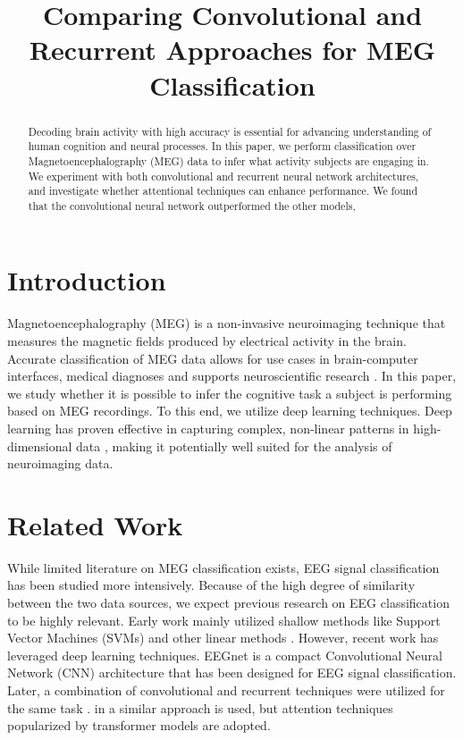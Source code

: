 \documentclass[conference]{IEEEtran}
\begin{document}
\title{Comparing Convolutional and Recurrent Approaches for MEG Classification}

\author{
}

\maketitle

\begin{abstract}
Decoding brain activity with high accuracy is essential for advancing understanding of human cognition and 
neural processes. In this paper, we perform classification over Magnetoencephalography (MEG) data to infer what
activity subjects are engaging in. We experiment with both convolutional and recurrent neural network architectures, and
investigate whether attentional techniques can enhance performance. We found that the convolutional neural network outperformed
 the other models,




\end{abstract}

\section{Introduction}
Magnetoencephalography (MEG) is a non-invasive neuroimaging technique that measures the magnetic fields produced by electrical 
activity in the brain. Accurate classification of MEG data allows for use cases in brain-computer interfaces, medical diagnoses and
supports neuroscientific research \cite{belhadi2025eeg}. In this paper, we study whether it is possible to infer the cognitive task a subject is performing
based  on MEG recordings. To this end, we utilize deep learning techniques. Deep learning has proven effective in capturing complex, non-linear
 patterns in high-dimensional data \cite{lecun2015deep}, making it potentially well suited for the analysis of neuroimaging data. 

\section{Related Work}
While limited literature on MEG classification exists, EEG signal classification has been studied more intensively. Because of the
high degree of similarity between the two data sources, we expect previous research on EEG classification to be highly relevant.
Early work mainly utilized shallow methods like Support Vector Machines (SVMs) and other linear methods \cite{besserve2007classification}.
However, recent work \cite{lawhern2018eegnet} \cite{zhang2018cascade} \cite{abdellaoui2020deepbrainstateclassification}  has leveraged deep learning
techniques. EEGnet \cite{lawhern2018eegnet} is a compact Convolutional Neural Network (CNN) architecture  that has been designed for EEG signal classification. 
 Later, a combination of convolutional and recurrent techniques were utilized for the same task \cite{zhang2018cascade}. in \cite{abdellaoui2020deepbrainstateclassification} a similar approach is used,
but attention techniques popularized by transformer models \cite{vaswani2017attention} are adopted. 
\end{document}
